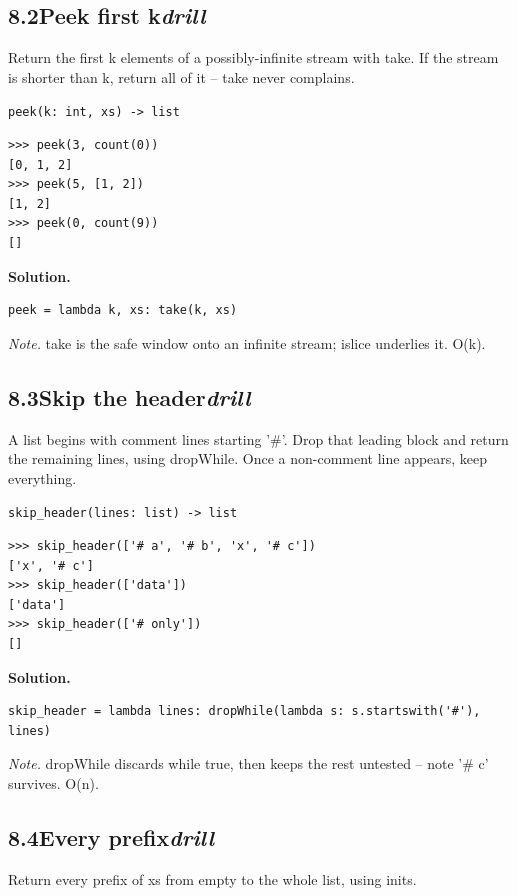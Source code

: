 \documentclass[10pt,letterpaper]{book}
\begin{document}
\subsection*{8.2\quad Peek first k\hfill\textnormal{\textit{drill}}}
Return the first k elements of a possibly-infinite stream with take. If the stream is shorter than k, return all of it -- take never complains.

\noindent\texttt{peek(k: int, xs) -> list}
\begin{lstlisting}[style=ex]
>>> peek(3, count(0))
[0, 1, 2]
>>> peek(5, [1, 2])
[1, 2]
>>> peek(0, count(9))
[]
\end{lstlisting}
\noindent\textbf{Solution.}
\begin{lstlisting}[style=code]
peek = lambda k, xs: take(k, xs)
\end{lstlisting}
\noindent\textit{Note.} take is the safe window onto an infinite stream; islice underlies it. O(k).

\subsection*{8.3\quad Skip the header\hfill\textnormal{\textit{drill}}}
A list begins with comment lines starting '\#'. Drop that leading block and return the remaining lines, using dropWhile. Once a non-comment line appears, keep everything.

\noindent\texttt{skip\_header(lines: list) -> list}
\begin{lstlisting}[style=ex]
>>> skip_header(['# a', '# b', 'x', '# c'])
['x', '# c']
>>> skip_header(['data'])
['data']
>>> skip_header(['# only'])
[]
\end{lstlisting}
\noindent\textbf{Solution.}
\begin{lstlisting}[style=code]
skip_header = lambda lines: dropWhile(lambda s: s.startswith('#'), lines)
\end{lstlisting}
\noindent\textit{Note.} dropWhile discards while true, then keeps the rest untested -- note '\# c' survives. O(n).


\subsection*{8.4\quad Every prefix\hfill\textnormal{\textit{drill}}}
Return every prefix of xs from empty to the whole list, using inits.
\end{document}

